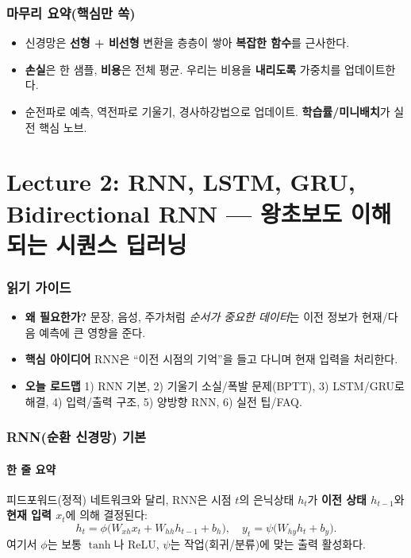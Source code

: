 \documentclass[12pt]{article}
\begin{document}
\section*{마무리 요약(핵심만 쏙)}
\begin{itemize}
  \item 신경망은 \textbf{선형 + 비선형} 변환을 층층이 쌓아 \textbf{복잡한 함수}를 근사한다.
  \item \textbf{손실}은 한 샘플, \textbf{비용}은 전체 평균. 우리는 비용을 \textbf{내리도록} 가중치를 업데이트한다.
  \item 순전파로 예측, 역전파로 기울기, 경사하강법으로 업데이트. \textbf{학습률/미니배치}가 실전 핵심 노브.
\end{itemize}

\newpage

\part{Lecture 2: RNN, LSTM, GRU, Bidirectional RNN — 왕초보도 이해되는 시퀀스 딥러닝}

\section*{읽기 가이드}
\begin{itemize}[left=0pt]
  \item \textbf{왜 필요한가?} 문장, 음성, 주가처럼 \emph{순서가 중요한 데이터}는 이전 정보가 현재/다음 예측에 큰 영향을 준다.
  \item \textbf{핵심 아이디어} RNN은 ``이전 시점의 기억''을 들고 다니며 현재 입력을 처리한다.
  \item \textbf{오늘 로드맵} 1) RNN 기본, 2) 기울기 소실/폭발 문제(BPTT), 3) LSTM/GRU로 해결, 4) 입력/출력 구조, 5) 양방향 RNN, 6) 실전 팁/FAQ.
\end{itemize}

\section{RNN(순환 신경망) 기본}
\subsection{한 줄 요약}
피드포워드(정적) 네트워크와 달리, RNN은 시점 $t$의 은닉상태 $h_t$가 \textbf{이전 상태 $h_{t-1}$}와 \textbf{현재 입력 $x_t$}에 의해 결정된다:
\[
h_t = \phi\!\big(W_{xh}x_t + W_{hh}h_{t-1} + b_h\big),\quad
y_t = \psi\!\big(W_{hy}h_t + b_y\big).
\]
여기서 $\phi$는 보통 $\tanh$나 ReLU, $\psi$는 작업(회귀/분류)에 맞는 출력 활성화다.
\end{document}
